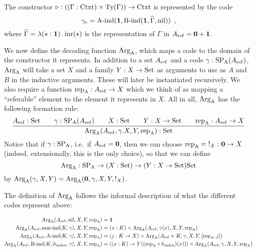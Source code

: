 \documentclass{article}
\begin{document}
\begin{example}
  The constructor $\triangleright : ((\Gamma : \text{Ctxt}) \times \text{Ty}(\Gamma))
  \to \text{Ctxt}$ is represented by the code
\[
\gamma_{\triangleright} = \text{A-ind}(\mathbf{1}, \text{B-ind}(\mathbf{1}, \widehat{\Gamma}, \text{nil})) \enspace ,
\]
where $\widehat{\Gamma} = \lambda (\star : \mathbf{1})\,.\,\text{inr}(\star)$ is the representation of $\Gamma$ in $A_{\mathrm{ref}} = \mathbf{0} + \mathbf{1}$.
\blackqed
\end{example}

We now define the decoding function $\text{Arg}_{\mathrm{A}}$, which maps a code to the
domain of the constructor it represents. In addition to a set $A_{\mathrm{ref}}$
and a code $\gamma : \text{SP}_{\mathrm{A}}(A_{\mathrm{ref}})$, $\text{Arg}_{\mathrm{A}}$ will take a set $X$ and a
family $Y : X \to \text{Set}$ as arguments to use as $A$ and $B$ in the
inductive arguments. These will later be instantiated recursively. We
also require a function $\text{rep}_{\mathrm{A}} : A_{\mathrm{ref}} \to X$ which we think of as
mapping a ``referable'' element to the element it represents in
$X$. All in all, $\text{Arg}_{\mathrm{A}}$ has the following formation rule:
%
\[
\infer{\ArgA(\Aref, \gamma. X, Y, \repA) : \Set}{\Aref : \Set
                                         & \quad \gamma : \SPA(\Aref)
                                         & \quad X : \Set
                                         & \quad Y : X \to \Set
                                         & \quad \repA : \Aref \to X}
\]
%
Notice that if $\gamma : \text{SP}_{\mathrm{A}}$, i.e.\ if $A_{\mathrm{ref}} = \mathbf{0}$, then we can
choose $\text{rep}_{\mathrm{A}} = {} !_{X} : \mathbf{0} \to X$ (indeed, extensionally,
this is the only choice), so that we can define
\[
\text{Arg}_{\mathrm{A}} : \text{SP}_{\mathrm{A}} \to (X : \text{Set}) \to (Y : X \to \text{Set}) \text{Set}
\]
by $\text{Arg}_{\mathrm{A}}(\gamma, X, Y) = \text{Arg}_{\mathrm{A}}(\mathbf{0}, \gamma, X, Y, !_{X})$.

The definition of $\text{Arg}_{\mathrm{A}}$ follows the informal description of what the
different codes represent above:

\begin{align*} 
  \text{Arg}_{\mathrm{A}}(A_{\mathrm{ref}}, \text{nil}, X, Y, \text{rep}_{\mathrm{A}}) &= \mathbf{1} \\
  \text{Arg}_{\mathrm{A}}(A_{\mathrm{ref}}, \text{non-ind}(K, \gamma), X, Y, \text{rep}_{\mathrm{A}}) &= (x : K) \times \text{Arg}_{\mathrm{A}}(A_{\mathrm{ref}}, \gamma(x), X, Y, \text{rep}_{\mathrm{A}}) \\
  \text{Arg}_{\mathrm{A}}(A_{\mathrm{ref}}, \text{A-ind}(K, \gamma), X, Y, \text{rep}_{\mathrm{A}}) &=  (j : K \to X) \times \text{Arg}_{\mathrm{A}}(A_{\mathrm{ref}} + K, \gamma, X, Y, [\text{rep}_{\mathrm{A}}, j]) \\
  \text{Arg}_{\mathrm{A}}(A_{\mathrm{ref}}, \text{B-ind}(K, h_{\mathrm{index}}, \gamma), X, Y, \text{rep}_{\mathrm{A}}) &=  ((x : K) \to Y((\text{rep}_{\mathrm{A}} \circ h_{\mathrm{index}})(x))) \times \text{Arg}_{\mathrm{A}}(A_{\mathrm{ref}}, \gamma, X, Y, \text{rep}_{\mathrm{A}}) \\
\end{align*}
\end{document}
